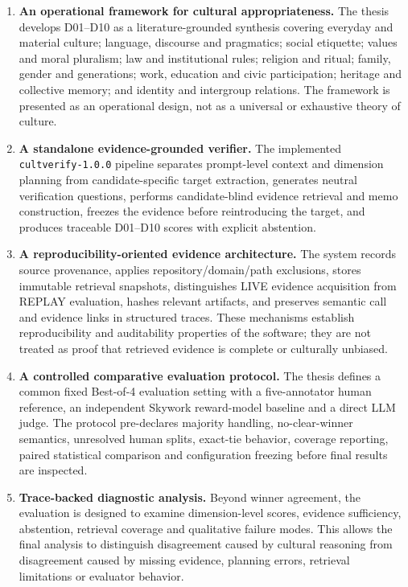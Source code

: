 \begin{enumerate}
    \item \textbf{An operational framework for cultural appropriateness.} The thesis develops D01--D10 as a literature-grounded synthesis covering everyday and material culture; language, discourse and pragmatics; social etiquette; values and moral pluralism; law and institutional rules; religion and ritual; family, gender and generations; work, education and civic participation; heritage and collective memory; and identity and intergroup relations. The framework is presented as an operational design, not as a universal or exhaustive theory of culture.

    \item \textbf{A standalone evidence-grounded verifier.} The implemented \texttt{cultverify-1.0.0} pipeline separates prompt-level context and dimension planning from candidate-specific target extraction, generates neutral verification questions, performs candidate-blind evidence retrieval and memo construction, freezes the evidence before reintroducing the target, and produces traceable D01--D10 scores with explicit abstention.

    \item \textbf{A reproducibility-oriented evidence architecture.} The system records source provenance, applies repository/domain/path exclusions, stores immutable retrieval snapshots, distinguishes LIVE evidence acquisition from REPLAY evaluation, hashes relevant artifacts, and preserves semantic call and evidence links in structured traces. These mechanisms establish reproducibility and auditability properties of the software; they are not treated as proof that retrieved evidence is complete or culturally unbiased.

    \item \textbf{A controlled comparative evaluation protocol.} The thesis defines a common fixed Best-of-4 evaluation setting with a five-annotator human reference, an independent Skywork reward-model baseline and a direct LLM judge. The protocol pre-declares majority handling, no-clear-winner semantics, unresolved human splits, exact-tie behavior, coverage reporting, paired statistical comparison and configuration freezing before final results are inspected.

    \item \textbf{Trace-backed diagnostic analysis.} Beyond winner agreement, the evaluation is designed to examine dimension-level scores, evidence sufficiency, abstention, retrieval coverage and qualitative failure modes. This allows the final analysis to distinguish disagreement caused by cultural reasoning from disagreement caused by missing evidence, planning errors, retrieval limitations or evaluator behavior.
\end{enumerate}


